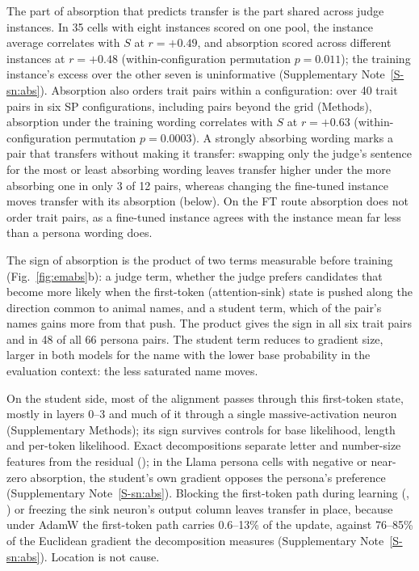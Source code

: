 

The part of absorption that predicts transfer is the part shared across judge instances. In 35 cells with eight instances scored on one pool, the instance average correlates with $S$ at $r = +0.49$, and absorption scored across different instances at $r = +0.48$ (within-configuration permutation $p = 0.011$); the training instance's excess over the other seven is uninformative (Supplementary Note~\ref{S-sn:abs}). Absorption also orders trait pairs within a configuration: over 40 trait pairs in six SP configurations, including pairs beyond the grid (Methods), absorption under the training wording correlates with $S$ at $r = +0.63$ (within-configuration permutation $p = 0.0003$). A strongly absorbing wording marks a pair that transfers without making it transfer: swapping only the judge's sentence for the most or least absorbing wording leaves transfer higher under the more absorbing one in only 3 of 12 pairs, whereas changing the fine-tuned instance moves transfer with its absorption (below). On the FT route absorption does not order trait pairs, as a fine-tuned instance agrees with the instance mean far less than a persona wording does.

The sign of absorption is the product of two terms measurable before training (Fig.~\ref{fig:emabs}b): a judge term, whether the judge prefers candidates that become more likely when the first-token (attention-sink)\cite{xiao2024efficient} state is pushed along the direction common to animal names, and a student term, which of the pair's names gains more from that push. The product gives the sign in all six  trait pairs and in 48 of all 66 persona pairs. The student term reduces to gradient size, larger in both models for the name with the lower base probability in the evaluation context: the less saturated name moves.

On the student side, most of the alignment passes through this first-token state, mostly in layers 0--3 and much of it through a single massive-activation neuron\cite{r14} (Supplementary Methods); its sign survives controls for base likelihood, length and per-token likelihood. Exact decompositions separate letter and number-size features from the residual (\edtab{\ref{tab:ed-chan}}); in the Llama persona cells with negative or near-zero absorption, the student's own gradient opposes the persona's preference (Supplementary Note~\ref{S-sn:abs}). Blocking the first-token path during learning (, ) or freezing the sink neuron's output column leaves transfer in place, because under AdamW the first-token path carries 0.6--13\% of the update, against 76--85\% of the Euclidean gradient the decomposition measures (Supplementary Note~\ref{S-sn:abs}). Location is not cause.
